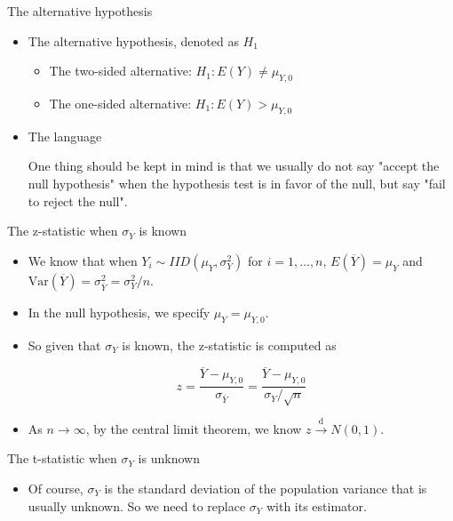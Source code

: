 \documentclass[presentation]{beamer}
\begin{document}
\begin{frame}[label={sec:org5b3f53b}]{The alternative hypothesis}
\begin{itemize}
\item The alternative hypothesis, denoted as \(H_1\)
\begin{itemize}
\item The two-sided alternative: \(H_1: E(Y) \neq \mu_{Y,0}\)
\item The one-sided alternative: \(H_1: E(Y) > \mu_{Y,0}\)
\end{itemize}

\item The language 

One thing should be kept in mind is that we usually do not say "accept
the null hypothesis" when the hypothesis test is in favor of the null,
but say "fail to reject the null".
\end{itemize}
\end{frame}

\begin{frame}[label={sec:orgbfb1c4a}]{The z-statistic when \(\sigma_Y\) is known}
\begin{itemize}
\item We know that when \(Y_i \sim IID(\mu_Y, \sigma^2_Y)\) for \(i=1, \ldots,
  n\), \(E(\overline{Y}) = \mu_Y\) and
\(\mathrm{Var}(\overline{Y}) = \sigma^2_{\overline{Y}} = \sigma^2_Y /
  n\).

\item In the null hypothesis, we specify \(\mu_Y = \mu_{Y,0}\).

\item So given that \(\sigma_Y\) is known, the z-statistic is computed as 

\[ z = \frac{\overline{Y} -
  \mu_{Y,0}}{\sigma_{\overline{Y}}} = \frac{\overline{Y} -
  \mu_{Y,0}}{\sigma_Y/\sqrt{n}} \]

\item As \(n \rightarrow \infty\), by the central limit theorem, we know \(z
  \xrightarrow{\text{ d }} N(0, 1)\).
\end{itemize}
\end{frame}

\begin{frame}[label={sec:orgbb1706d}]{The t-statistic when \(\sigma_Y\) is unknown}
\begin{itemize}
\item Of course, \(\sigma_Y\) is the standard deviation of the population
variance that is usually unknown. So we need to replace \(\sigma_Y\)
with its estimator.
\end{itemize}
\end{frame}
\end{document}
